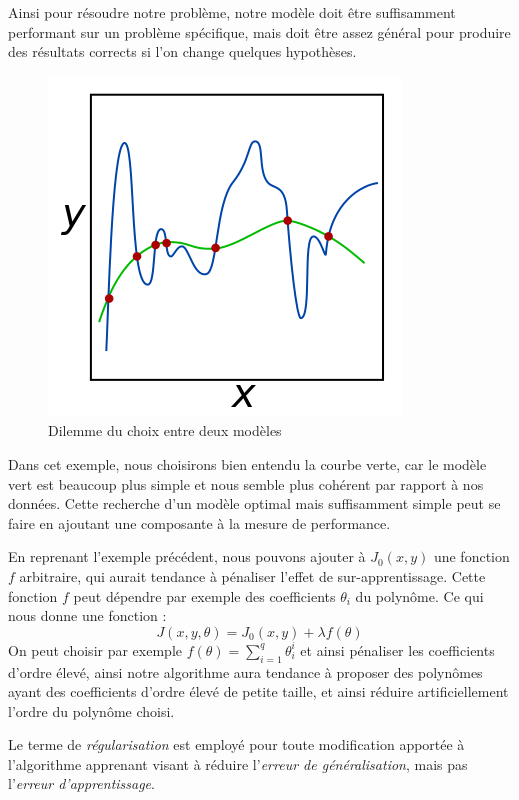 \documentclass[a4paper, 11pt]{report}
\begin{document}
Ainsi pour résoudre notre problème, notre modèle doit être suffisamment performant sur un problème spécifique, mais doit être assez général pour produire des résultats corrects si l'on change quelques hypothèses.
\begin{figure}[H]
	\begin{center}
		\includegraphics[scale=0.5]{Images/Regularization.png}
		\caption{Dilemme du choix entre deux modèles}
	\end{center}
\end{figure}
Dans cet exemple, nous choisirons bien entendu la courbe verte, car le modèle vert est beaucoup plus simple et nous semble plus cohérent par rapport à nos données.
Cette recherche d'un modèle optimal mais suffisamment simple peut se faire en ajoutant une composante à la mesure de performance.

En reprenant l'exemple précédent, nous pouvons ajouter à $J_0(x,y)$ une fonction $f$ arbitraire, qui aurait tendance à pénaliser l'effet de sur-apprentissage.
Cette fonction $f$ peut dépendre par exemple des coefficients $\theta_i$ du polynôme.
Ce qui nous donne une fonction :
$$J(x,y,\theta) = J_0(x,y) + \lambda f(\theta)$$
On peut choisir par exemple $f(\theta) = \sum_{i=1}^{q}{\theta_i^i}$ et ainsi pénaliser les coefficients d'ordre élevé, ainsi notre algorithme aura tendance à proposer des polynômes ayant des coefficients d'ordre élevé de petite taille, et ainsi réduire artificiellement l'ordre du polynôme choisi.

Le terme de \emph{régularisation} est employé pour toute modification apportée à l'algorithme apprenant visant à réduire l'\emph{erreur de généralisation}, mais pas l'\emph{erreur d'apprentissage}.
	
\end{document}
